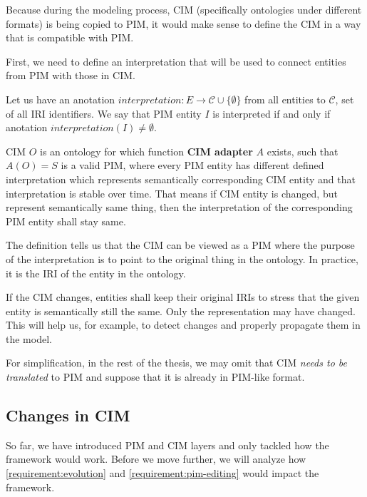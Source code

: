 \bigskip

Because during the modeling process, CIM (specifically ontologies under different formats) is being copied to PIM, it would make sense to define the CIM in a way that is compatible with PIM.

First, we need to define an interpretation that will be used to connect entities from PIM with those in CIM.

\begin{definition}[interpretation]
    Let us have an anotation $interpretation: E \rightarrow \mathcal{C} \cup \{\emptyset\}$ from all entities to $\mathcal{C}$, set of all IRI identifiers. We say that PIM entity $I$ is interpreted if and only if anotation $interpretation(I) \neq \emptyset$.
\end{definition}

\begin{definition}[CIM]
    CIM $O$ is an ontology for which function \textbf{CIM adapter} $A$ exists, such that $A(O) = S$ is a valid PIM, where every PIM entity has different defined interpretation which represents semantically corresponding CIM entity and that interpretation is stable over time. That means if CIM entity is changed, but represent semantically same thing, then the interpretation of the corresponding PIM entity shall stay same.
\end{definition}

The definition tells us that the CIM can be viewed as a PIM where the purpose of the interpretation is to point to the original thing in the ontology. In practice, it is the IRI of the entity in the ontology.

If the CIM changes, entities shall keep their original IRIs to stress that the given entity is semantically still the same. Only the representation may have changed. This will help us, for example, to detect changes and properly propagate them in the model.

For simplification, in the rest of the thesis, we may omit that CIM \textit{needs to be translated} to PIM and suppose that it is already in PIM-like format.

\subsection{Changes in CIM}

So far, we have introduced PIM and CIM layers and only tackled how the framework would work. Before we move further, we will analyze how \autoref{requirement:evolution} and \ref{requirement:pim-editing} would impact the framework.


